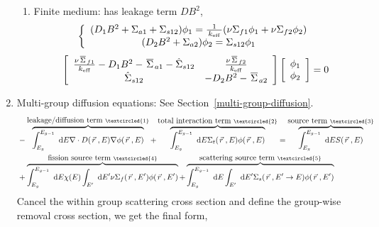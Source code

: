 \documentclass{school-22.211-notes}
\begin{document}
\begin{enumerate}
\begin{enumerate}
    \item Finite medium: has leakage term $DB^2$, 
       \begin{align}
         \left\{ \begin{array}{c}
           (D_1 B^2 + \Sigma_{a1} + \Sigma_{s12} ) \phi_1 = \frac{1}{\left. k_{\mathrm{eff}} \right.} ( \nu \Sigma_{f1} \phi_1 + \nu \Sigma_{f2} \phi_2 )  \\
           (D_2 B^2 +  \Sigma_{a2}) \phi_2 = \Sigma_{s12} \phi_1 
         \end{array} \right. 
       \end{align}
      \begin{align}
        \left[ \begin{array}{cc} 
            \frac{\nu \left.\overline{\Sigma} \right._{f1}}{\left. k_{\mathrm{eff}} \right.} - D_1 B^2 -  \left.\overline{\Sigma} \right._{a1}  - \hat{\Sigma}_{s12} & \frac{\nu \left.\overline{\Sigma} \right._{f2}}{\left. k_{\mathrm{eff}} \right.}   \\
            \hat{\Sigma}_{s12} &  - D_2B^2 - \left.\overline{\Sigma} \right._{a2}  
          \end{array} \right] 
        \left[ \begin{array}{c} \phi_1 \\ \phi_2 \end{array} \right] = 0
      \end{align}

\end{enumerate}

\item Multi-group diffusion equations: See Section~\ref{multi-group-diffusion}. 
\begin{align}
& - \overbrace{\int_{E_g}^{E_{g-1}} \dE \divergence D(\vecr, E) \gradient \phi(\vecr, E)}^{\mbox{leakage/diffusion term }\textcircled{1}} + 
\overbrace{\int_{E_g}^{E_{g-1}} \dE \Sigma_t(\vecr, E) \phi(\vecr, E)}^{\mbox{total interaction term }\textcircled{2}} = \overbrace{\int_{E_g}^{E_{g-1}} \dE S(\vecr, E)}^{\mbox{source term } \textcircled{3}}  \\
& + \overbrace{\int_{E_g}^{E_{g-1}} \dE \chi(E) \int_{E'} \dE' \nu \Sigma_f (\vecr, E') \phi(\vecr, E')}^{\mbox{fission source term }\textcircled{4}} 
 + \overbrace{\int_{E_g}^{E_{g-1}} \dE \int_{E'} \dE' \Sigma_s(\vecr, E'\to E) \phi(\vecr, E')}^{\mbox{scattering source term }\textcircled{5}} 
\end{align}
Cancel the within group scattering cross section and define the group-wise removal cross section, we get the final form,


\end{enumerate}
\end{document}
